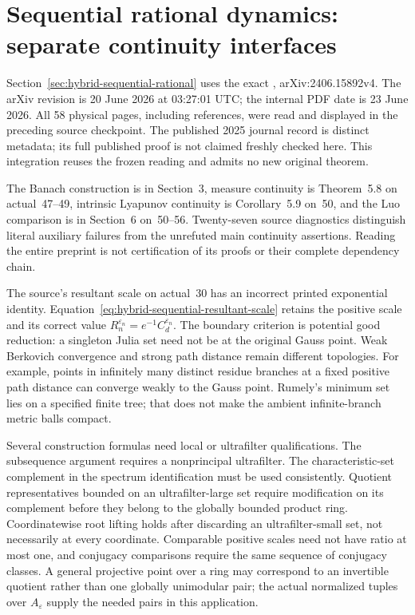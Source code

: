 \section{Sequential rational dynamics: separate continuity interfaces}
\label{sec:provenance-hybrid-sequential}

Section~\ref{sec:hybrid-sequential-rational} uses the exact
\cite{FavreGong26SequentialV4}, arXiv:\allowbreak 2406.15892v4.
The arXiv revision is 20 June 2026 at 03:27:01 UTC; the internal
PDF date is 23 June 2026. All 58 physical pages, including references,
were read and displayed in the preceding source checkpoint.
The published 2025 journal record is distinct metadata; its full
published proof is not claimed freshly checked here. This integration
reuses the frozen reading and admits no new original theorem.

The Banach construction is in Section~3, measure continuity is
Theorem~5.8 on actual~47--49, intrinsic Lyapunov continuity is
Corollary~5.9 on~50, and the Luo comparison is in Section~6
on~50--56. Twenty-seven source diagnostics distinguish literal
auxiliary failures from the unrefuted main continuity assertions.
Reading the entire preprint is not certification of its proofs
or their complete dependency chain.

The source's resultant scale on actual~30 has an incorrect printed
exponential identity. Equation~\eqref{eq:hybrid-sequential-resultant-scale}
retains the positive scale and its correct value
$R_n^{\varepsilon_n}=e^{-1}C_d^{\varepsilon_n}$.
The boundary criterion is potential good reduction: a singleton Julia
set need not be at the original Gauss point. Weak Berkovich convergence
and strong path distance remain different topologies. For example,
points in infinitely many distinct residue branches at a fixed
positive path distance can converge weakly to the Gauss point.
Rumely's minimum set lies on a specified finite tree; that does not
make the ambient infinite-branch metric balls compact.

Several construction formulas need local or ultrafilter qualifications.
The subsequence argument requires a nonprincipal ultrafilter.
The characteristic-set complement in the spectrum identification
must be used consistently. Quotient representatives bounded on an
ultrafilter-large set require modification on its complement before
they belong to the globally bounded product ring. Coordinatewise
root lifting holds after discarding an ultrafilter-small set, not
necessarily at every coordinate. Comparable positive scales need
not have ratio at most one, and conjugacy comparisons require the
same sequence of conjugacy classes. A general projective point over
a ring may correspond to an invertible quotient rather than one
globally unimodular pair; the actual normalized tuples over
$A_\varepsilon$ supply the needed pairs in this application.

